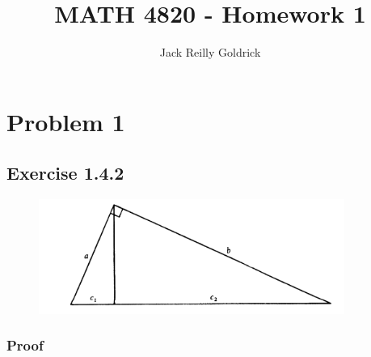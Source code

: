 \documentclass[]{report}
\title{MATH 4820 - Homework 1}
\author{Jack Reilly Goldrick}
\begin{document}
\maketitle


\section{Problem 1}

\subsection{Exercise 1.4.2}
\begin{center}
	

	\begin{figure}[H]
		\includegraphics[width=10cm] {pics/1-triangle}
		
	\end{figure}
	
\end{center}




\subsubsection{Proof}
\end{document}
